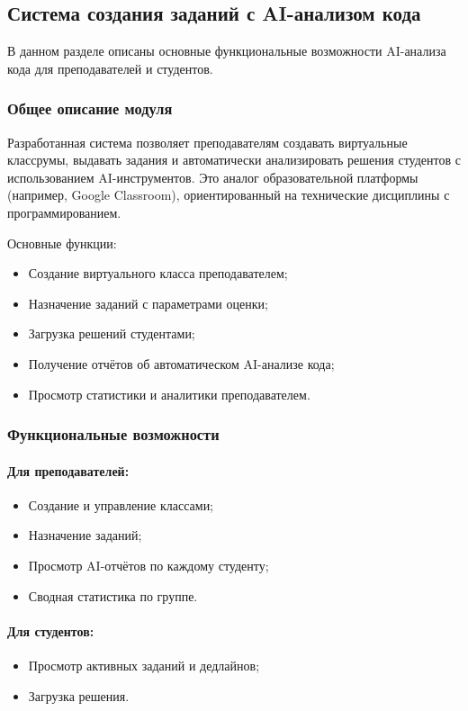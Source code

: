 \subsection{Система создания заданий с AI-анализом кода}

В данном разделе описаны основные функциональные возможности AI-анализа кода для преподавателей и студентов.

\subsubsection{Общее описание модуля}
Разработанная система позволяет преподавателям создавать виртуальные классрумы, выдавать задания и автоматически анализировать решения студентов с использованием AI-инструментов. Это аналог образовательной платформы (например, Google Classroom), ориентированный на технические дисциплины с программированием.

Основные функции:
\begin{itemize}
  \item Создание виртуального класса преподавателем;
  \item Назначение заданий с параметрами оценки;
  \item Загрузка решений студентами;
  \item Получение отчётов об автоматическом AI-анализе кода;
  \item Просмотр статистики и аналитики преподавателем.
\end{itemize}

\subsubsection{Функциональные возможности}

\paragraph{Для преподавателей:}
\begin{itemize}
  \item Создание и управление классами;
  \item Назначение заданий;
  \item Просмотр AI-отчётов по каждому студенту;
  \item Сводная статистика по группе.
\end{itemize}

\paragraph{Для студентов:}
\begin{itemize}
  \item Просмотр активных заданий и дедлайнов;
  \item Загрузка решения.
\end{itemize}

